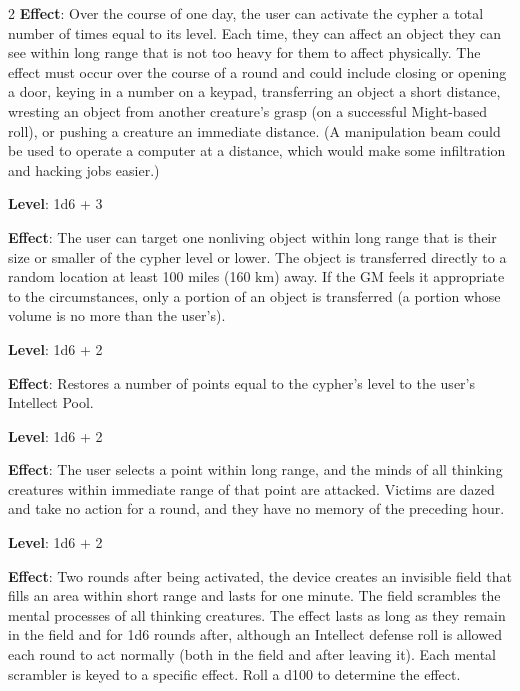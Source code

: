 \begin{multicols}{2}
\textbf{Effect}: Over the course of one day, the user can activate the cypher a total number of times equal to its level. Each time, they can affect an object they can see within long range that is not too heavy for them to affect physically. The effect must occur over the course of a round and could include closing or opening a door, keying in a number on a keypad, transferring an object a short distance, wresting an object from another creature’s grasp (on a successful Might-based roll), or pushing a creature an immediate distance. (A manipulation beam could be used to operate a computer at a distance, which would make some infiltration and hacking jobs easier.)


\textbf{Level}: 1d6 + 3

\textbf{Effect}: The user can target one nonliving object within long range that is their size or smaller of the cypher level or lower. The object is transferred directly to a random location at least 100 miles (160 km) away. If the GM feels it appropriate to the circumstances, only a portion of an object is transferred (a portion whose volume is no more than the user’s).


\textbf{Level}: 1d6 + 2

\textbf{Effect}: Restores a number of points equal to the cypher’s level to the user’s Intellect Pool.


\textbf{Level}: 1d6 + 2

\textbf{Effect}: The user selects a point within long range, and the minds of all thinking creatures within immediate range of that point are attacked. Victims are dazed and take no action for a round, and they have no memory of the preceding hour.


\textbf{Level}: 1d6 + 2

\textbf{Effect}: Two rounds after being activated, the device creates an invisible field that fills an area within short range and lasts for one minute. The field scrambles the mental processes of all thinking creatures. The effect lasts as long as they remain in the field and for 1d6 rounds after, although an Intellect defense roll is allowed each round to act normally (both in the field and after leaving it). Each mental scrambler is keyed to a specific effect. Roll a d100 to determine the effect.

\end{multicols}

